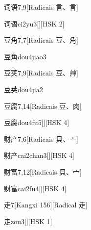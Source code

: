 \begin{entry}{词语}{7,9}[Radicais ⾔、⾔]
  \begin{phonetics}{词语}{ci2yu3}[][HSK 2]
  \end{phonetics}
\end{entry}

\begin{entry}{豆角}{7,7}[Radicais ⾖、⾓]
  \begin{phonetics}{豆角}{dou4jiao3}
  \end{phonetics}
\end{entry}

\begin{entry}{豆荚}{7,9}[Radicais ⾖、⾋]
  \begin{phonetics}{豆荚}{dou4jia2}
  \end{phonetics}
\end{entry}

\begin{entry}{豆腐}{7,14}[Radicais ⾖、⾁]
  \begin{phonetics}{豆腐}{dou4fu5}[][HSK 4]
  \end{phonetics}
\end{entry}

\begin{entry}{财产}{7,6}[Radicais ⾙、⼇]
  \begin{phonetics}{财产}{cai2chan3}[][HSK 4]
  \end{phonetics}
\end{entry}

\begin{entry}{财富}{7,12}[Radicais ⾙、⼧]
  \begin{phonetics}{财富}{cai2fu4}[][HSK 4]
  \end{phonetics}
\end{entry}

\begin{entry}{走}{7}[Kangxi 156][Radical ⾛]
  \begin{phonetics}{走}{zou3}[][HSK 1]
  \end{phonetics}
\end{entry}

